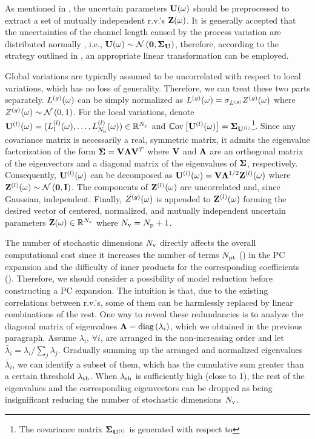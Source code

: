 As mentioned in , the uncertain parameters $\mathbf{U}(\omega)$ should be preprocessed to extract a set of mutually independent r.v.'s $\mathbf{Z}(\omega)$. It is generally accepted that the uncertainties of the channel length caused by the process variation are distributed normally \cite{srivastava2010, liu2007, juan2012}, i.e., $\vU(\o) \sim \normal{\vZero}{\mCov_\vU}$, therefore, according to the strategy outlined in , an appropriate linear transformation can be employed.

Global variations are typically assumed to be uncorrelated with respect to local variations, which has no loss of generality. Therefore, we can treat these two parts separately. ${L^{(g)}}(\omega)$ can be simply normalized as ${L^{(g)}}(\omega) = \sigma_{L^{(g)}} {Z^{(g)}}(\omega)$ where ${Z^{(g)}}(\omega) \sim \mathcal{N}\left( 0, 1 \right)$. For the local variations, denote ${\mathbf{U}^{(l)}}(\omega) = (L^{(l)}_1(\omega), \dotsc, L^{(l)}_{N_\text{p}}(\omega)) \in \mathbb{R}^{N_\text{p}}$ and $\oCov{\vlLeff(\o)} = \mCov_\vlLeff$\footnote{The covariance matrix $\mCov_\vlLeff$ is generated with respect to }. Since any covariance matrix is necessarily a real, symmetric matrix, it admits the eigenvalue factorization \cite{press2007} of the form $\mCov = \m{V} \m{\Lambda} \m{V}^T$ where $\m{V}$ and $\m{\Lambda}$ are an orthogonal matrix of the eigenvectors and a diagonal matrix of the eigenvalues of $\mCov$, respectively. Consequently, ${\mathbf{U}^{(l)}}(\omega)$ can be decomposed as $\vlLeff(\o) = \m{V} \m{\Lambda}^\ifrac{1}{2} \vlZ(\o)$ where $\vlZ(\o) \sim \normal{\vZero}{\mI}$. The components of ${\mathbf{Z}^{(l)}}(\omega)$ are uncorrelated and, since Gaussian, independent. Finally, ${Z^{(g)}}(\omega)$ is appended to ${\mathbf{Z}^{(l)}}(\omega)$ forming the desired vector of centered, normalized, and mutually independent uncertain parameters $\mathbf{Z}(\omega) \in \mathbb{R}^{N_\text{v}}$ where ${N_\text{v}} = {N_\text{p}} + 1$.

The number of stochastic dimensions ${N_\text{v}}$ directly affects the overall computational cost since it increases the number of terms ${N_\text{pt}}$ () in the PC expansion and the difficulty of inner products for the corresponding coefficients (). Therefore, we should consider a possibility of model reduction before constructing a PC expansion. The intuition is that, due to the existing correlations between r.v.'s, some of them can be harmlessly replaced by linear combinations of the rest. One way to reveal these redundancies is to analyze the diagonal matrix of eigenvalues $\m{\Lambda} = \diag{ \lambda_i }$, which we obtained in the previous paragraph. Assume $\lambda_i$, $\forall i$, are arranged in the non-increasing order and let $\bar{\lambda}_i = \lambda_i / \sum_j \lambda_j$. Gradually summing up the arranged and normalized eigenvalues $\bar{\lambda}_i$, we can identify a subset of them, which has the cumulative sum greater than a certain threshold $\lambda_\text{th}$. When $\lambda_\text{th}$ is sufficiently high (close to 1), the rest of the eigenvalues and the corresponding eigenvectors can be dropped as being insignificant reducing the number of stochastic dimensions ${N_\text{v}}$.

